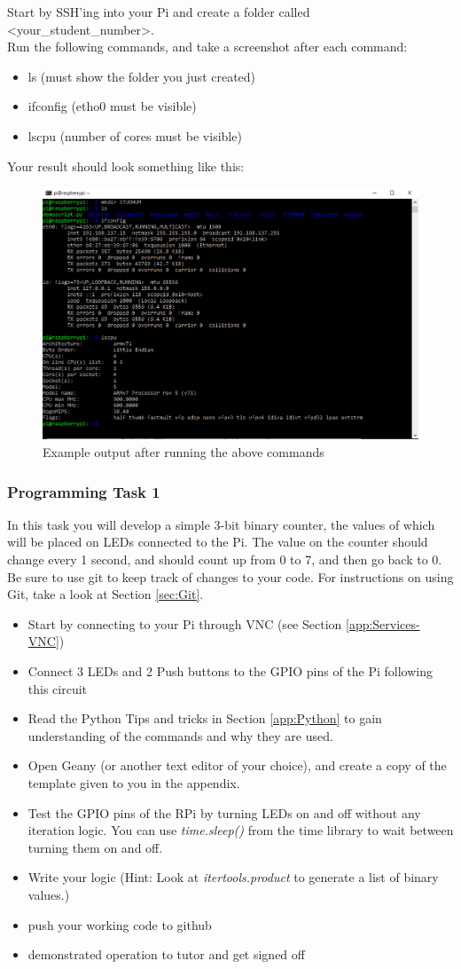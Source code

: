 Start by SSH'ing into your Pi and create a folder called \textless your\_student\_number\textgreater.\\
Run the following commands, and take a screenshot after each command:
\begin{itemize}
    \item ls (must show the folder you just created)
    \item ifconfig (etho0 must be visible)
    \item lscpu (number of cores must be visible)
\end{itemize}
Your result should look something like this:
\begin{figure}[H]
\centering
\includegraphics[width=0.6\columnwidth]{Figures/CMDOutput}
\caption{Example output after running the above commands}
\label{fig:CMDOutput}
\end{figure}



\subsubsection{Programming Task 1}
In this task you will develop a simple 3-bit binary counter, the values of which will be placed on LEDs connected to the Pi. The value on the counter should change every 1 second, and should count up from 0 to 7, and then go back to 0.
Be sure to use git to keep track of changes to your code. For instructions on using Git, take a look at Section \ref{sec:Git}.
\begin{itemize}
    \item Start by connecting to your Pi through VNC (see Section \ref{app:Services-VNC})
    \item Connect 3 LEDs and 2 Push buttons to the GPIO pins of the Pi following this circuit
    \item Read the Python Tips and tricks in Section \ref{app:Python} to gain understanding of the commands and why they are used.
    \item Open Geany (or another text editor of your choice), and create a copy of the template given to you in the appendix.
    \item Test the GPIO pins of the RPi by turning LEDs on and off without any iteration logic. You can use \textit{time.sleep()} from the time library to wait between turning them on and off.
    \item Write your logic (Hint: Look at \textit{itertools.product} to generate a list of binary values.)
    \item push your working code to github
    \item demonstrated operation to tutor and get signed off
\end{itemize}


